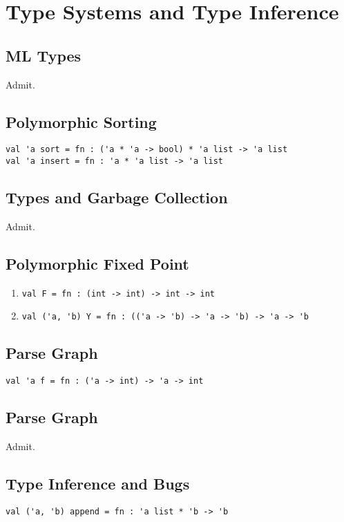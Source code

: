\chapter{Type Systems and Type Inference}

\section{ML Types}
Admit.


\section{Polymorphic Sorting}
\begin{verbatim}
val 'a sort = fn : ('a * 'a -> bool) * 'a list -> 'a list
val 'a insert = fn : 'a * 'a list -> 'a list
\end{verbatim}


\section{Types and Garbage Collection}
Admit.


\section{Polymorphic Fixed Point}
\begin{enumerate}
  \item
\begin{verbatim}
val F = fn : (int -> int) -> int -> int
\end{verbatim}

  \item 
\begin{verbatim}
val ('a, 'b) Y = fn : (('a -> 'b) -> 'a -> 'b) -> 'a -> 'b
\end{verbatim}
\end{enumerate}


\section{Parse Graph}
\begin{verbatim}
val 'a f = fn : ('a -> int) -> 'a -> int
\end{verbatim}


\section{Parse Graph}
Admit.


\section{Type Inference and Bugs}
\begin{verbatim}
val ('a, 'b) append = fn : 'a list * 'b -> 'b
\end{verbatim}


